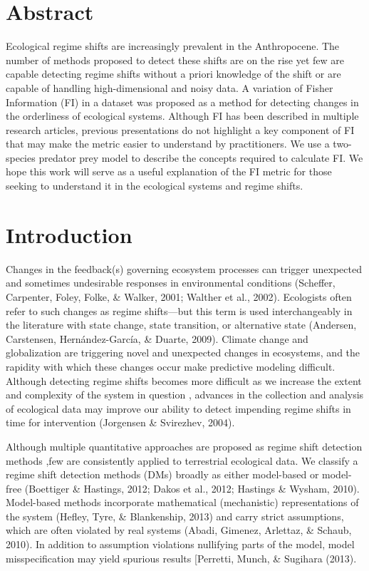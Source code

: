 \documentclass[12pt,twoside]{reedthesis}
\begin{document}
\hypertarget{abstract}{%
\section{Abstract}\label{abstract}}

Ecological regime shifts are increasingly prevalent in the Anthropocene. The number of methods proposed to detect these shifts are on the rise yet few are capable detecting regime shifts without a priori knowledge of the shift or are capable of handling high-dimensional and noisy data. A variation of Fisher Information (FI) in a dataset was proposed as a method for detecting changes in the orderliness of ecological systems. Although FI has been described in multiple research articles, previous presentations do not highlight a key component of FI that may make the metric easier to understand by practitioners. We use a two-species predator prey model to describe the concepts required to calculate FI. We hope this work will serve as a useful explanation of the FI metric for those seeking to understand it in the ecological systems and regime shifts.

\hypertarget{introduction-1}{%
\section{Introduction}\label{introduction-1}}

Changes in the feedback(s) governing ecosystem processes can trigger unexpected and sometimes undesirable responses in environmental conditions (Scheffer, Carpenter, Foley, Folke, \& Walker, 2001; Walther et al., 2002). Ecologists often refer to such changes as regime shifts---but this term is used interchangeably in the literature with state change, state transition, or alternative state (Andersen, Carstensen, Hernández-García, \& Duarte, 2009). Climate change and globalization are triggering novel and unexpected changes in ecosystems, and the rapidity with which these changes occur make predictive modeling difficult. Although detecting regime shifts becomes more difficult as we increase the extent and complexity of the system in question , advances in the collection and analysis of ecological data may improve our ability to detect impending regime shifts in time for intervention (Jorgensen \& Svirezhev, 2004).

Although multiple quantitative approaches are proposed as regime shift detection methods ,few are consistently applied to terrestrial ecological data. We classify a regime shift detection methods (DMs) broadly as either model-based or model-free (Boettiger \& Hastings, 2012; Dakos et al., 2012; Hastings \& Wysham, 2010). Model-based methods incorporate mathematical (mechanistic) representations of the system (Hefley, Tyre, \& Blankenship, 2013) and carry strict assumptions, which are often violated by real systems (Abadi, Gimenez, Arlettaz, \& Schaub, 2010). In addition to assumption violations nullifying parts of the model, model misspecification may yield spurious results {[}Perretti, Munch, \& Sugihara (2013).
\end{document}
